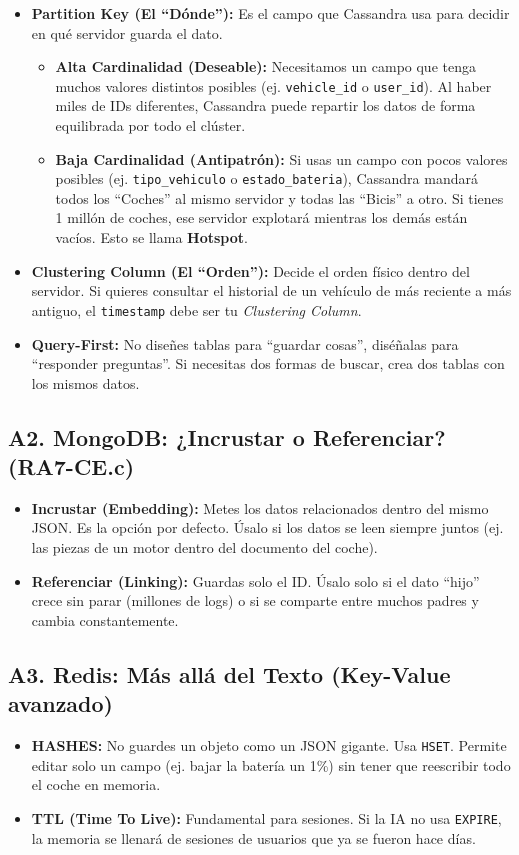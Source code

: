 \documentclass[12pt,a4paper]{article}
\begin{document}
\begin{itemize}
    \item \textbf{Partition Key (El \enquote{Dónde}):} Es el campo que Cassandra usa para decidir en qué servidor guarda el dato.
    \begin{itemize}
        \item \textbf{Alta Cardinalidad (Deseable):} Necesitamos un campo que tenga muchos valores distintos posibles (ej. \texttt{vehicle\_id} o \texttt{user\_id}). Al haber miles de IDs diferentes, Cassandra puede repartir los datos de forma equilibrada por todo el clúster.
        \item \textbf{Baja Cardinalidad (Antipatrón):} Si usas un campo con pocos valores posibles (ej. \texttt{tipo\_vehiculo} o \texttt{estado\_bateria}), Cassandra mandará todos los \enquote{Coches} al mismo servidor y todas las \enquote{Bicis} a otro. Si tienes 1 millón de coches, ese servidor explotará mientras los demás están vacíos. Esto se llama \textbf{Hotspot}.
    \end{itemize}
    \item \textbf{Clustering Column (El \enquote{Orden}):} Decide el orden físico dentro del servidor. Si quieres consultar el historial de un vehículo de más reciente a más antiguo, el \texttt{timestamp} debe ser tu \textit{Clustering Column}.
    \item \textbf{Query-First:} No diseñes tablas para \enquote{guardar cosas}, diséñalas para \enquote{responder preguntas}. Si necesitas dos formas de buscar, crea dos tablas con los mismos datos.
\end{itemize}

\subsection*{A2. MongoDB: ¿Incrustar o Referenciar? (RA7-CE.c)}
\begin{itemize}
    \item \textbf{Incrustar (Embedding):} Metes los datos relacionados dentro del mismo JSON. Es la opción por defecto. Úsalo si los datos se leen siempre juntos (ej. las piezas de un motor dentro del documento del coche).
    \item \textbf{Referenciar (Linking):} Guardas solo el ID. Úsalo solo si el dato \enquote{hijo} crece sin parar (millones de logs) o si se comparte entre muchos padres y cambia constantemente.
\end{itemize}

\subsection*{A3. Redis: Más allá del Texto (Key-Value avanzado)}
\begin{itemize}
    \item \textbf{HASHES:} No guardes un objeto como un JSON gigante. Usa \texttt{HSET}. Permite editar solo un campo (ej. bajar la batería un 1\%) sin tener que reescribir todo el coche en memoria.
    \item \textbf{TTL (Time To Live):} Fundamental para sesiones. Si la IA no usa \texttt{EXPIRE}, la memoria se llenará de sesiones de usuarios que ya se fueron hace días.
\end{itemize}
\end{document}
